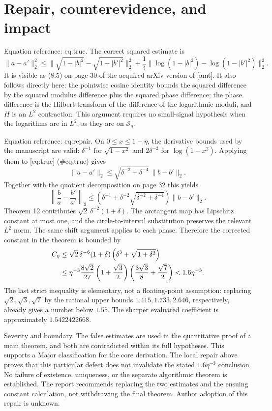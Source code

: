 \documentclass[10pt]{article}
\begin{document}
\section*{Repair, counterevidence, and impact}
Equation reference: eq:true. The correct squared estimate is \[
 \|a-a'\|_2^2\leq
 \big\|\sqrt{1-|b|^2}-\sqrt{1-|b'|^2}\big\|_2^2
 +\frac14\big\|\log(1-|b|^2)-\log(1-|b'|^2)\big\|_2^2 .\] It is visible as (8.5) on page 30 of the acquired arXiv version of [amt]. It also follows directly here: the pointwise cosine identity bounds the squared difference by the squared modulus difference plus the squared phase difference; the phase difference is the Hilbert transform of the difference of the logarithmic moduli, and \(H\) is an \(L^2\) contraction. This argument requires no small-signal hypothesis when the logarithms are in \(L^2\), as they are on \(\mathcal S_\eta\).\par
Equation reference: eq:repair. On \(0\leq x\leq1-\eta\), the derivative bounds used by the manuscript are valid: \(\delta^{-1}\) for \(\sqrt{1-x^2}\) and \(2\delta^{-2}\) for \(\log(1-x^2)\). Applying them to [eq:true] (\#eq:true) gives \[\|a-a'\|_2\leq
       \sqrt{\delta^{-2}+\delta^{-4}}\,\|b-b'\|_2.\] Together with the quotient decomposition on page 32 this yields \[\left\|\frac b a-\frac{b'}{a'}\right\|_2
 \leq\left(\delta^{-1}
       +\delta^{-2}\sqrt{\delta^{-2}+\delta^{-4}}\right)\|b-b'\|_2.\] Theorem 12 contributes \(\sqrt2\,\delta^{-2}(1+\delta)\). The arctangent map has Lipschitz constant at most one, and the circle-to-interval substitution preserves the relevant \(L^2\) norm. The same shift argument applies to each phase. Therefore the corrected constant in the theorem is bounded by \[\begin{aligned}
 C_\eta
 &\leq \sqrt2\,\delta^{-6}(1+\delta)
                    \left(\delta^3+\sqrt{1+\delta^2}\right)\notag\\
 &\leq \eta^{-3}\frac{8\sqrt2}{27}
     \left(1+\frac{\sqrt3}{2}\right)
     \left(\frac{3\sqrt3}{8}+\frac{\sqrt7}{2}\right)
 <1.6\eta^{-3}.                                      \end{aligned}\] The last strict inequality is elementary, not a floating-point assumption: replacing \(\sqrt2,\sqrt3,\sqrt7\) by the rational upper bounds \(1.415,1.733,2.646\), respectively, already gives a number below \(1.55\). The sharper evaluated coefficient is approximately \(1.5422422668\).\par
Severity and boundary. The false estimates are used in the quantitative proof of a main theorem, and both are contradicted within its full hypotheses. This supports a Major classification for the core derivation. The local repair above proves that this particular defect does not invalidate the stated \(1.6\eta^{-3}\) conclusion. No failure of existence, uniqueness, or the separate algorithmic theorem is established. The report recommends replacing the two estimates and the ensuing constant calculation, not withdrawing the final theorem. Author adoption of this repair is unknown.\par
\end{document}
